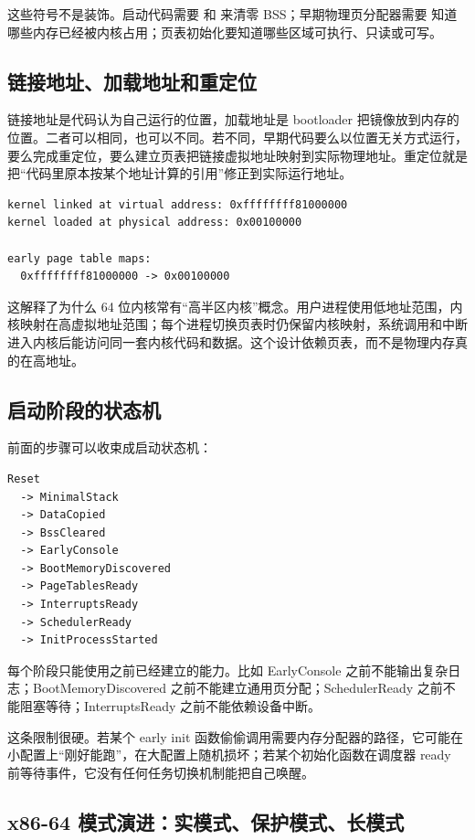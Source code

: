 这些符号不是装饰。启动代码需要  和  来清零 BSS；早期物理页分配器需要  知道哪些内存已经被内核占用；页表初始化要知道哪些区域可执行、只读或可写。

\subsection{链接地址、加载地址和重定位}

链接地址是代码认为自己运行的位置，加载地址是 bootloader 把镜像放到内存的位置。二者可以相同，也可以不同。若不同，早期代码要么以位置无关方式运行，要么完成重定位，要么建立页表把链接虚拟地址映射到实际物理地址。重定位就是把“代码里原本按某个地址计算的引用”修正到实际运行地址。

\begin{lstlisting}
kernel linked at virtual address: 0xffffffff81000000
kernel loaded at physical address: 0x00100000

early page table maps:
  0xffffffff81000000 -> 0x00100000
\end{lstlisting}

这解释了为什么 64 位内核常有“高半区内核”概念。用户进程使用低地址范围，内核映射在高虚拟地址范围；每个进程切换页表时仍保留内核映射，系统调用和中断进入内核后能访问同一套内核代码和数据。这个设计依赖页表，而不是物理内存真的在高地址。

\subsection{启动阶段的状态机}

前面的步骤可以收束成启动状态机：

\begin{lstlisting}
Reset
  -> MinimalStack
  -> DataCopied
  -> BssCleared
  -> EarlyConsole
  -> BootMemoryDiscovered
  -> PageTablesReady
  -> InterruptsReady
  -> SchedulerReady
  -> InitProcessStarted
\end{lstlisting}

每个阶段只能使用之前已经建立的能力。比如 EarlyConsole 之前不能输出复杂日志；BootMemoryDiscovered 之前不能建立通用页分配；SchedulerReady 之前不能阻塞等待；InterruptsReady 之前不能依赖设备中断。

这条限制很硬。若某个 early init 函数偷偷调用需要内存分配器的路径，它可能在小配置上“刚好能跑”，在大配置上随机损坏；若某个初始化函数在调度器 ready 前等待事件，它没有任何任务切换机制能把自己唤醒。

\subsection{x86-64 模式演进：实模式、保护模式、长模式}

